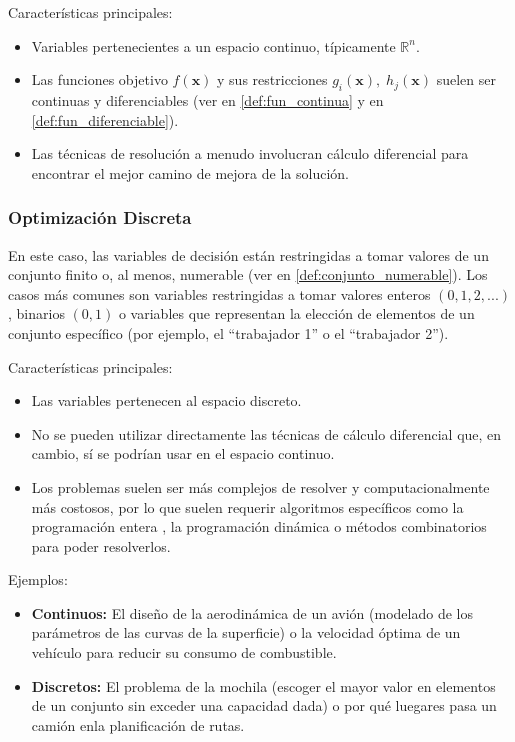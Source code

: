 \documentclass[12pt,a4paper]{book}
\begin{document}
Características principales:
\begin{itemize}
    \item Variables pertenecientes a un espacio continuo, típicamente $\mathbb{R}^n$.
    \item Las funciones objetivo $f(\mathbf{x})$ y sus restricciones $g_i(\mathbf{x}), \;h_j(\mathbf{x})$ suelen ser continuas y diferenciables (ver en \ref{def:fun_continua} y en \ref{def:fun_diferenciable}).
    \item Las técnicas de resolución a menudo involucran cálculo diferencial para encontrar el mejor camino de mejora de la solución.
\end{itemize}

\subsubsection{Optimización Discreta}
En este caso, las variables de decisión están restringidas a tomar valores de un conjunto finito o, al menos, numerable (ver en \ref{def:conjunto_numerable}). Los casos más comunes son variables restringidas a tomar valores enteros $(0,1,2,...)$, binarios $(0,1)$ o variables que representan la elección de elementos de un conjunto específico (por ejemplo, el ``trabajador 1'' o el ``trabajador 2'').

Características principales:
\begin{itemize}
    \item Las variables pertenecen al espacio discreto.
    \item No se pueden utilizar directamente las técnicas de cálculo diferencial que, en cambio, sí se podrían usar en el espacio continuo.
    \item Los problemas suelen ser más complejos de resolver y computacionalmente más costosos, por lo que suelen requerir algoritmos específicos como la programación entera \citep{int_programing}, la programación dinámica o métodos combinatorios para poder resolverlos.
\end{itemize}

Ejemplos:
\begin{itemize}
    \item \textbf{Continuos:} El diseño de la aerodinámica de un avión (modelado de los parámetros de las curvas de la superficie) o la velocidad óptima de un vehículo para reducir su consumo de combustible.
    \item \textbf{Discretos:} El problema de la mochila (escoger el mayor valor en elementos de un conjunto sin exceder una capacidad dada) o por qué luegares pasa un camión enla planificación de rutas.
\end{itemize}
\end{document}
